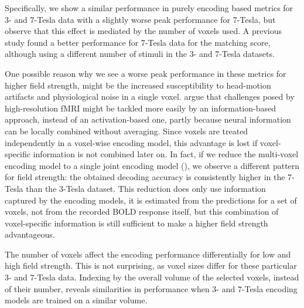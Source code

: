 Specifically, we show a similar performance in purely encoding based metrics
for 3- and 7-Tesla data with a slightly worse peak performance for 7-Tesla, but
observe that this effect is mediated by the number of voxels used. A previous
study \citep{SF14} found a better performance for 7-Tesla data for the matching
score, although using a different number of stimuli in the 3- and 7-Tesla
datasets. %

One possible reason why we see a worse peak performance in these metrics for
higher field strength, might be the increased susceptibility to head-motion
artifacts and physiological noise in a single voxel. \citet{KB07} argue that
challenges posed by high-resolution f{MRI} might be tackled more easily by an
information-based approach, instead of an activation-based one, partly because
neural information can be locally combined without averaging. Since voxels are
treated independently in a voxel-wise encoding model, this advantage is lost if
voxel-specific information is not combined later on.
In fact, if we reduce the
multi-voxel encoding model to a single joint encoding model
(\citep[see][]{NG09}), we observe a different pattern for field strength: the
obtained decoding accuracy is consistently higher in the 7-Tesla than the
3-Tesla dataset.  This reduction does only use information captured by the
encoding models, it is estimated from the predictions for a set of voxels, not
from the recorded BOLD response itself, but this combination of voxel-specific
information is still sufficient to make a higher field strength advantageous. 

The number of voxels affect the encoding performance differentially for low and
high field strength. This is not surprising, as voxel sizes differ for these
particular 3- and 7-Tesla data. Indexing by the overall volume of the selected
voxels, instead of their number, reveals similarities in performance when 3-
and 7-Tesla encoding models are trained on a similar volume. 

